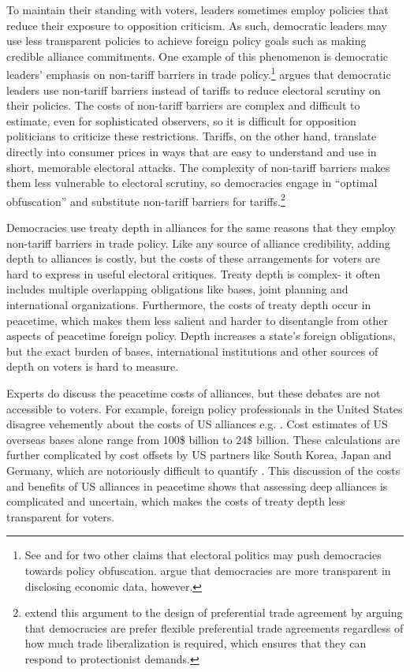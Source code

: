 \documentclass[12pt]{article}
\begin{document}
To maintain their standing with voters, leaders sometimes employ policies that reduce their exposure to opposition criticism.
As such, democratic leaders may use less transparent policies to achieve foreign policy goals such as making credible alliance commitments.  
One example of this phenomenon is democratic leaders' emphasis on non-tariff barriers in trade policy.\footnote{See \citet{Rejali2007} and \citet{Stasavage2004} for two other claims that electoral politics may push democracies towards policy obfuscation. \citet{Hollyeretal2011} argue that democracies are more transparent in disclosing economic data, however.}
\citet{Kono2006} argues that democratic leaders use non-tariff barriers instead of tariffs to reduce electoral scrutiny on their policies.
The costs of non-tariff barriers are complex and difficult to estimate, even for sophisticated observers, so it is difficult for opposition politicians to criticize these restrictions. 
Tariffs, on the other hand, translate directly into consumer prices in ways that are easy to understand and use in short, memorable electoral attacks.
The complexity of non-tariff barriers makes them less vulnerable to electoral scrutiny, so democracies engage in ``optimal obfuscation'' and substitute non-tariff barriers for tariffs.\footnote{\citet{Baccinietal2015} extend this argument to the design of preferential trade agreement by arguing that democracies are prefer flexible preferential trade agreements regardless of how much trade liberalization is required, which ensures that they can respond to protectionist demands.}  


Democracies use treaty depth in alliances for the same reasons that they employ non-tariff barriers in trade policy.
Like any source of alliance credibility, adding depth to alliances is costly, but the costs of these arrangements for voters are hard to express in useful electoral critiques.
Treaty depth is complex- it often includes multiple overlapping obligations like bases, joint planning and international organizations.
Furthermore, the costs of treaty depth occur in peacetime, which makes them less salient and harder to disentangle from other aspects of peacetime foreign policy. 
Depth increases a state's foreign obligations, but the exact burden of bases, international institutions and other sources of depth on voters is hard to measure. 


Experts do discuss the peacetime costs of alliances, but these debates are not accessible to voters. 
For example, foreign policy professionals in the United States disagree vehemently about the costs of US alliances e.g. \citep{Brooksetal2013, Posen2014, BrandsFeaver2017}.
Cost estimates of US overseas bases alone range from 100\$ billion \citep{Vine2015} to 24\$ billion. 
These calculations are further complicated by cost offsets by US partners like South Korea, Japan and Germany, which are notoriously difficult to quantify \citep{Lostumboetal2013}.  
This discussion of the costs and benefits of US alliances in peacetime shows that assessing deep alliances is complicated and uncertain, which makes the costs of treaty depth less transparent for voters. 
\end{document}

